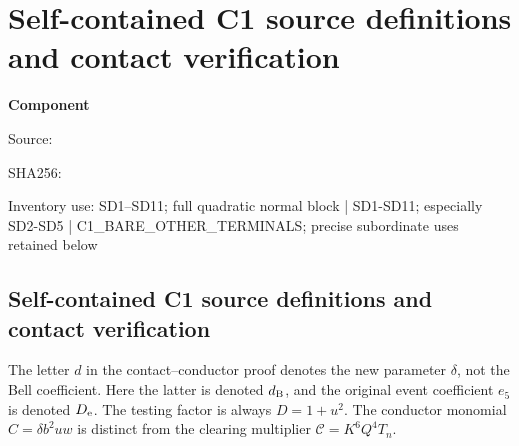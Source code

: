 \chapter{Self-contained C1 source definitions and contact verification}
\label{component:p0acdb66bba2f}
\noindent\textbf{Component }\par
{\small\noindent Source: \par}
{\small\noindent SHA256: \par}
{\small\noindent Inventory use: SD1--SD11; full quadratic normal block | SD1-SD11; especially SD2-SD5 | C1\_\allowbreak{}BARE\_\allowbreak{}OTHER\_\allowbreak{}TERMINALS; precise subordinate uses retained below\par}
\medskip
\section{Self-contained C1 source definitions and contact verification}
\label{p0acdb66bba2f:app:c1-source-definitions}

The letter $d$ in the contact--conductor proof denotes the new parameter
$\delta$, not the Bell coefficient. Here the latter is denoted $d_{\rm B}$,
and the original event coefficient $e_5$ is denoted $D_{\rm e}$.
The testing factor is always $D=1+u^2$. The conductor monomial
$C=\delta b^2uw$ is distinct from the clearing multiplier
$\mathcal C=K^6Q^4T_n$.

